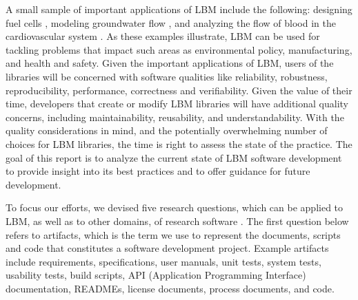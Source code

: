\documentclass[final, 3p, times, authoryear]{elsarticle}
\begin{document}
A small sample of important applications of LBM include the following: designing
fuel cells \citep{ZhangEtAl2018}, modeling groundwater flow
\citep{AnwarAndSukop2009}, and analyzing the flow of blood in the cardiovascular
system \citep{SadeghiEtAl2020}.  As these examples illustrate, LBM can be used
for tackling problems that impact such areas as environmental policy,
manufacturing, and health and safety.  Given the important applications of LBM,
users of the libraries will be concerned with software qualities like
reliability, robustness, reproducibility, performance, correctness and
verifiability.  Given the value of their time, developers that create or modify
LBM libraries will have additional quality concerns, including maintainability,
reusability, and understandability.  With the quality considerations in mind,
and the potentially overwhelming number of choices for LBM libraries, the time
is right to assess the state of the practice.  The goal of this report is to
analyze the current state of LBM software development to provide insight into
its best practices and to offer guidance for future development.

To focus our efforts, we devised five research questions, which can be applied
to LBM, as well as to other domains, of research software \citep{SmithEtAl2021}.
The first question below refers to artifacts, which is the term we use to
represent the documents, scripts and code that constitutes a software
development project. Example artifacts include requirements, specifications,
user manuals, unit tests, system tests, usability tests, build scripts, API
(Application Programming Interface) documentation, READMEs, license documents,
process documents, and code.
\end{document}
